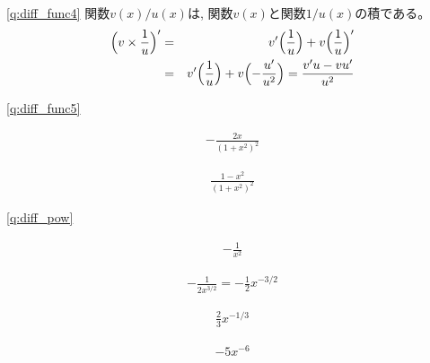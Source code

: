 \ref{q:diff_func4} 関数$v(x)/u(x)$は, 関数$v(x)$と関数$1/u(x)$の積である。
\begin{eqnarray*}
\Bigl(v\times\frac{1}{u}\Bigr)'&=&v'\Bigl(\frac{1}{u}\Bigr)+v\Bigl(\frac{1}{u}\Bigr)'\\
&=&v'\Bigl(\frac{1}{u}\Bigr)+v\Bigl(-\frac{u'}{u^2}\Bigr)=\frac{v'u-vu'}{u^2}
\end{eqnarray*}

\ref{q:diff_func5}
\begin{edaenumerate}
\item \begin{eqnarray*}-\frac{2x}{(1+x^2)^2}\end{eqnarray*}
\item \begin{eqnarray*}\frac{1-x^2}{(1+x^2)^2}\end{eqnarray*}
\end{edaenumerate}

\ref{q:diff_pow} 
\begin{edaenumerate}
\item \begin{eqnarray*}-\frac{1}{x^2}\end{eqnarray*}
\item \begin{eqnarray*}-\frac{1}{2x^{3/2}}=-\frac{1}{2}x^{-3/2}\end{eqnarray*}
\item \begin{eqnarray*}\frac{2}{3}x^{-1/3}\end{eqnarray*}
\item \begin{eqnarray*}-5x^{-6}\end{eqnarray*}
\end{edaenumerate}


